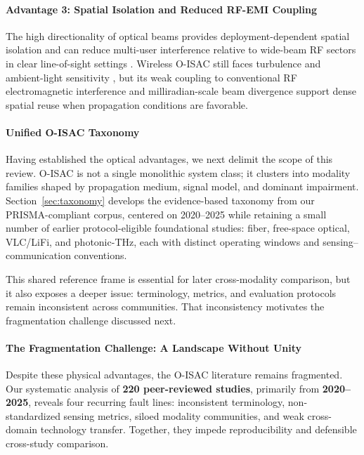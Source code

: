 \documentclass[letterpaper,journal]{IEEEtran}
\begin{document}
\paragraph{Advantage 3: Spatial Isolation and Reduced RF-EMI Coupling}
The high directionality of optical beams provides deployment-dependent spatial isolation and can reduce multi-user interference relative to wide-beam RF sectors in clear line-of-sight settings . Wireless O-ISAC still faces turbulence and ambient-light sensitivity , but its weak coupling to conventional RF electromagnetic interference and milliradian-scale beam divergence support dense spatial reuse when propagation conditions are favorable.

\paragraph{Unified O-ISAC Taxonomy}

Having established the optical advantages, we next delimit the scope of this review. O-ISAC is not a single monolithic system class; it clusters into modality families shaped by propagation medium, signal model, and dominant impairment. Section~\ref{sec:taxonomy} develops the evidence-based taxonomy from our PRISMA-compliant corpus, centered on 2020--2025 while retaining a small number of earlier protocol-eligible foundational studies: fiber, free-space optical, VLC/LiFi, and photonic-THz, each with distinct operating windows and sensing--communication conventions.

This shared reference frame is essential for later cross-modality comparison, but it also exposes a deeper issue: terminology, metrics, and evaluation protocols remain inconsistent across communities. That inconsistency motivates the fragmentation challenge discussed next.

\paragraph{The Fragmentation Challenge: A Landscape Without Unity}

Despite these physical advantages, the O-ISAC literature remains fragmented. Our systematic analysis of \textbf{220 peer-reviewed studies}, primarily from \textbf{2020--2025}, reveals four recurring fault lines: inconsistent terminology, non-standardized sensing metrics, siloed modality communities, and weak cross-domain technology transfer. Together, they impede reproducibility and defensible cross-study comparison.
\end{document}
